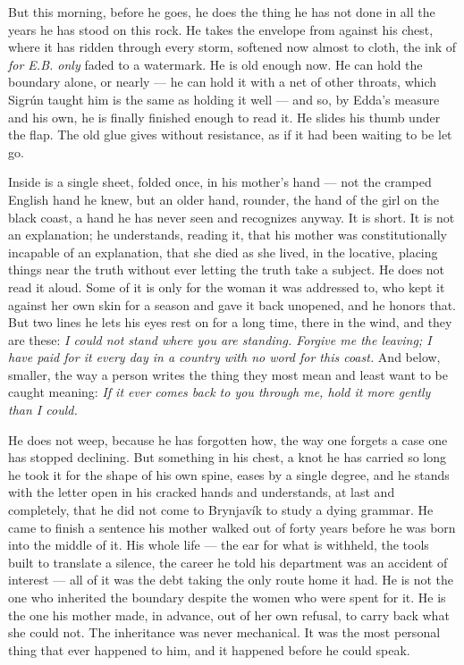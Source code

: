 \documentclass[11pt,oneside]{book}
\newcommand{\sceneline}{%
  \par\vspace{1.2em}
  \begin{center}
    \fontsize{11}{11}\selectfont \textbullet\quad\textbullet\quad\textbullet
  \end{center}
  \vspace{0.6em}\noindent\ignorespaces
}
\begin{document}
\sceneline

But this morning, before he goes, he does the thing he has not done in
all the years he has stood on this rock. He takes the envelope from
against his chest, where it has ridden through every storm, softened now
almost to cloth, the ink of \emph{for E.B. only} faded to a watermark.
He is old enough now. He can hold the boundary alone, or nearly --- he
can hold it with a net of other throats, which Sigrún taught him is the
same as holding it well --- and so, by Edda's measure and his own, he is
finally finished enough to read it. He slides his thumb under the flap.
The old glue gives without resistance, as if it had been waiting to be
let go.

Inside is a single sheet, folded once, in his mother's hand --- not the
cramped English hand he knew, but an older hand, rounder, the hand of
the girl on the black coast, a hand he has never seen and recognizes
anyway. It is short. It is not an explanation; he understands, reading
it, that his mother was constitutionally incapable of an explanation,
that she died as she lived, in the locative, placing things near the
truth without ever letting the truth take a subject. He does not read it
aloud. Some of it is only for the woman it was addressed to, who kept it
against her own skin for a season and gave it back unopened, and he
honors that. But two lines he lets his eyes rest on for a long time,
there in the wind, and they are these: \emph{I could not stand where you
are standing. Forgive me the leaving; I have paid for it every day in a
country with no word for this coast.} And below, smaller, the way a
person writes the thing they most mean and least want to be caught
meaning: \emph{If it ever comes back to you through me, hold it more
gently than I could.}

He does not weep, because he has forgotten how, the way one forgets a
case one has stopped declining. But something in his chest, a knot he
has carried so long he took it for the shape of his own spine, eases by
a single degree, and he stands with the letter open in his cracked hands
and understands, at last and completely, that he did not come to
Brynjavík to study a dying grammar. He came to finish a sentence his
mother walked out of forty years before he was born into the middle of
it. His whole life --- the ear for what is withheld, the tools built to
translate a silence, the career he told his department was an accident
of interest --- all of it was the debt taking the only route home it
had. He is not the one who inherited the boundary despite the women who
were spent for it. He is the one his mother made, in advance, out of her
own refusal, to carry back what she could not. The inheritance was never
mechanical. It was the most personal thing that ever happened to him,
and it happened before he could speak.
\end{document}
